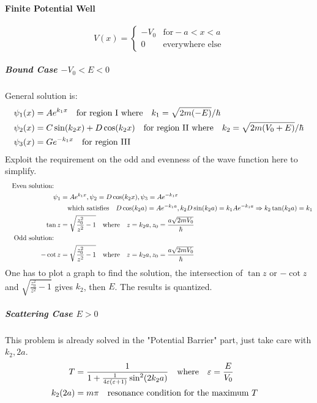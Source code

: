 \documentclass[a4paper,10pt]{article}
\begin{document}
\paragraph{Finite Potential Well}
$$V(x)=\begin{cases}
        -V_0 & \text{for}-a<x<a       \\
        0    & \text{everywhere else}
    \end{cases}$$
\subparagraph{Bound Case $-V_0<E<0$}
General solution is:
\begin{align*}
    \psi_1(x) & =Ae^{k_1x}\qq{for region I where}k_1=\sqrt{2m(-E)}/\hbar                   \\
    \psi_2(x) & =C\sin(k_2x)+D\cos(k_2x)\qq{for region II where}k_2=\sqrt{2m(V_0+E)}/\hbar \\
    \psi_3(x) & =Ge^{-k_1x}\qq{for region III}
\end{align*}
Exploit the requirement on the odd and evenness of the wave function here to simplify.
\begin{align*}
    \qq{Even solution:} &                                                                                                       \\
    \psi_1              & =Ae^{k_1x},\psi_2=D\cos(k_2x),\psi_3=Ae^{-k_1x}                                                       \\
                        & \qq{which satisfies} D\cos(k_2a)=Ae^{-k_1a},k_2D\sin(k_2a)=k_1Ae^{-k_1a}\Rightarrow k_2\tan(k_2a)=k_1 \\
    \tan z              & =\sqrt{\frac{z_0^2}{z^2}-1}\qq{where}z=k_2a,z_0=\frac{a\sqrt{2mV_0}}{\hbar}                           \\
    \qq{Odd solution:}  &                                                                                                       \\
    -\cot z             & =\sqrt{\frac{z_0^2}{z^2}-1}\qq{where}z=k_2a,z_0=\frac{a\sqrt{2mV_0}}{\hbar}                           \\
\end{align*}
One has to plot a graph to find the solution, the intersection of $\tan z$ or $-\cot z$ and $\sqrt{\frac{z_0^2}{z^2}-1}$ gives $k_2$, then $E$. The results is quantized.
\subparagraph{Scattering Case $E>0$}
This problem is already solved in the "Potential Barrier" part, just take care with $k_2,2a$.
\begin{align*}
    T       & =\frac{1}{1+\frac{1}{4\varepsilon(\varepsilon+1)}\sin^2(2k_2a)}\qq{where}\varepsilon=\frac{E}{V_0} \\
    k_2(2a) & =m\pi\qq{resonance condition for the maximum $T$}
\end{align*}
\end{document}
